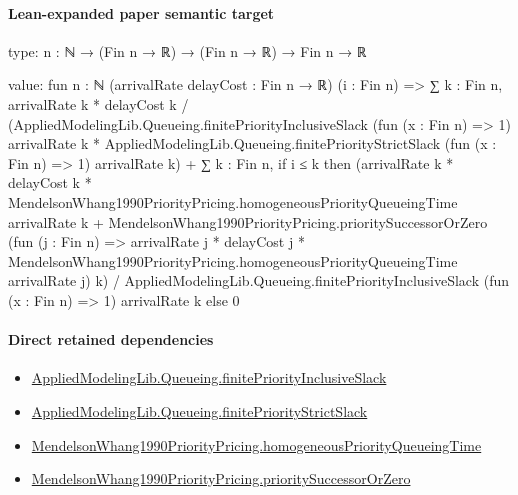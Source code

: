 \documentclass[10pt]{article}
\begin{document}
\paragraph{Lean-expanded paper semantic target}
\begin{ReviewVerbatim}
type:
{n : ℕ} → (Fin n → ℝ) → (Fin n → ℝ) → Fin n → ℝ

value:
fun {n : ℕ} (arrivalRate delayCost : Fin n → ℝ) (i : Fin n) =>
  ∑ k : Fin n,
      arrivalRate k * delayCost k /
        (AppliedModelingLib.Queueing.finitePriorityInclusiveSlack (fun (x : Fin n) => 1) arrivalRate k *
          AppliedModelingLib.Queueing.finitePriorityStrictSlack (fun (x : Fin n) => 1) arrivalRate k) +
    ∑ k : Fin n,
      if i ≤ k then
        (arrivalRate k * delayCost k * MendelsonWhang1990PriorityPricing.homogeneousPriorityQueueingTime arrivalRate k +
            MendelsonWhang1990PriorityPricing.prioritySuccessorOrZero
              (fun (j : Fin n) =>
                arrivalRate j * delayCost j *
                  MendelsonWhang1990PriorityPricing.homogeneousPriorityQueueingTime arrivalRate j)
              k) /
          AppliedModelingLib.Queueing.finitePriorityInclusiveSlack (fun (x : Fin n) => 1) arrivalRate k
      else 0
\end{ReviewVerbatim}

\paragraph{Direct retained dependencies}
\begin{itemize}\raggedright
\item \hyperlink{governing-declaration-f2b9a1af307e7469}{Applied\allowbreak{}Modeling\allowbreak{}Lib.\allowbreak{}Queueing.\allowbreak{}finite\allowbreak{}Priority\allowbreak{}Inclusive\allowbreak{}Slack}
\item \hyperlink{governing-declaration-3f5cf610a8190094}{Applied\allowbreak{}Modeling\allowbreak{}Lib.\allowbreak{}Queueing.\allowbreak{}finite\allowbreak{}Priority\allowbreak{}Strict\allowbreak{}Slack}
\item \hyperlink{paper-prerequisite-69133735a09302ef}{Mendelson\allowbreak{}Whang1990\allowbreak{}Priority\allowbreak{}Pricing.\allowbreak{}homogeneous\allowbreak{}Priority\allowbreak{}Queueing\allowbreak{}Time}
\item \hyperlink{governing-declaration-f2dbc4d52705c26d}{Mendelson\allowbreak{}Whang1990\allowbreak{}Priority\allowbreak{}Pricing.\allowbreak{}priority\allowbreak{}Successor\allowbreak{}Or\allowbreak{}Zero}
\end{itemize}
\end{document}
